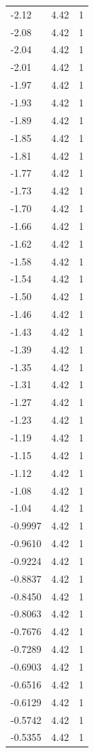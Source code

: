 \begin{longtable}{lrr}
  -2.12 & 4.42 & 1 \\
  -2.08 & 4.42 & 1 \\
  -2.04 & 4.42 & 1 \\
  -2.01 & 4.42 & 1 \\
  -1.97 & 4.42 & 1 \\
  -1.93 & 4.42 & 1 \\
  -1.89 & 4.42 & 1 \\
  -1.85 & 4.42 & 1 \\
  -1.81 & 4.42 & 1 \\
  -1.77 & 4.42 & 1 \\
  -1.73 & 4.42 & 1 \\
  -1.70 & 4.42 & 1 \\
  -1.66 & 4.42 & 1 \\
  -1.62 & 4.42 & 1 \\
  -1.58 & 4.42 & 1 \\
  -1.54 & 4.42 & 1 \\
  -1.50 & 4.42 & 1 \\
  -1.46 & 4.42 & 1 \\
  -1.43 & 4.42 & 1 \\
  -1.39 & 4.42 & 1 \\
  -1.35 & 4.42 & 1 \\
  -1.31 & 4.42 & 1 \\
  -1.27 & 4.42 & 1 \\
  -1.23 & 4.42 & 1 \\
  -1.19 & 4.42 & 1 \\
  -1.15 & 4.42 & 1 \\
  -1.12 & 4.42 & 1 \\
  -1.08 & 4.42 & 1 \\
  -1.04 & 4.42 & 1 \\
  -0.9997 & 4.42 & 1 \\
  -0.9610 & 4.42 & 1 \\
  -0.9224 & 4.42 & 1 \\
  -0.8837 & 4.42 & 1 \\
  -0.8450 & 4.42 & 1 \\
  -0.8063 & 4.42 & 1 \\
  -0.7676 & 4.42 & 1 \\
  -0.7289 & 4.42 & 1 \\
  -0.6903 & 4.42 & 1 \\
  -0.6516 & 4.42 & 1 \\
  -0.6129 & 4.42 & 1 \\
  -0.5742 & 4.42 & 1 \\
  -0.5355 & 4.42 & 1 \\

\end{longtable}
